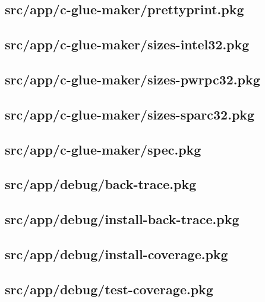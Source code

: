 \subsection{src/app/c-glue-maker/prettyprint.pkg}


\subsection{src/app/c-glue-maker/sizes-intel32.pkg}


\subsection{src/app/c-glue-maker/sizes-pwrpc32.pkg}


\subsection{src/app/c-glue-maker/sizes-sparc32.pkg}


\subsection{src/app/c-glue-maker/spec.pkg}


\subsection{src/app/debug/back-trace.pkg}


\subsection{src/app/debug/install-back-trace.pkg}


\subsection{src/app/debug/install-coverage.pkg}


\subsection{src/app/debug/test-coverage.pkg}


